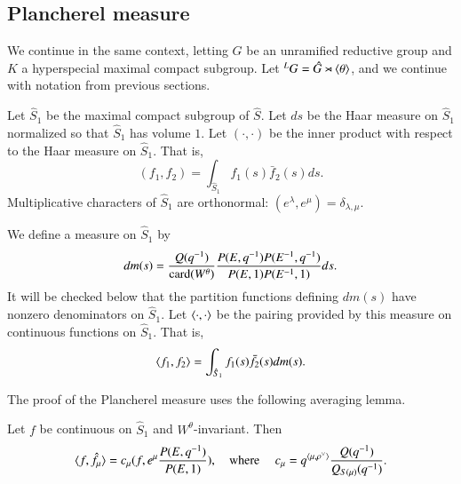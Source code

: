 \subsection{Plancherel measure}
We continue in the same context, letting $G$ be an unramified
reductive group and $K$ a hyperspecial maximal compact subgroup.  Let
${}^LG = \hat G\rtimes \langle{\theta}\rangle$, and we continue with notation
from previous sections.

Let $\hat S_1$ be the maximal compact subgroup of $\hat S$.  Let $ds$
be the Haar measure on $\hat S_1$ normalized so that $\hat S_1$ has
volume $1$.  Let $(\cdot,\cdot)$ be the inner product with respect to
the Haar measure on $\hat S_1$. That is,
\begin{equation}
(f_1,f_2) = \int_{\hat S_1} f_1(s) \bar f_2(s) ds.
\end{equation}
Multiplicative characters of $\hat S_1$ are orthonormal:
$(e^\lambda,e^\mu) = \delta_{\lambda,\mu}$.

We define a measure on $\hat S_1$ by
\begin{equation}
dm(s) = \frac{Q(q^{-1})}{{\operatorname{card}}(W^\theta)}
\frac{P(E,q^{-1}) P(E^{-1},q^{-1})}{P(E,1) P(E^{-1},1)} ds.
\end{equation}
It will be checked below that the partition functions defining $dm(s)$
have nonzero denominators on $\hat S_1$.  Let $\langle{\cdot,\cdot}\rangle$ be
the pairing provided by this measure on continuous functions on $\hat
S_1$.  That is,
\begin{equation}
\langle{f_1,f_2}\rangle = \int_{\hat S_1} f_1(s) \bar f_2(s) dm(s).
\end{equation}

The proof of the Plancherel measure uses the following averaging lemma.

\begin{lemma}\label{lemma:average} 
  Let $f$ be continuous on $\hat S_1$ and $W^\theta$-invariant.  Then
\[
\langle{f,\hat f_\mu}\rangle = c_\mu  (f, e^\mu\frac{ P(E,q^{-1})}{P(E,1)}),
\quad\text{where }\quad
c_\mu = q^{\langle{\mu,\rho^\vee}\rangle}\frac{ Q(q^{-1})}{Q_{S(\mu)}(q^{-1})}.
\]
\end{lemma}

